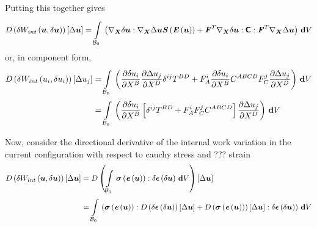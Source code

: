 Putting this together gives
\begin{equation}
  \directionalderiv{\delta\fnof{W_{int}}{\vectr{u},\delta\vectr{u}}}{\Delta\vectr{u}}=\gint{\embedmanifold{B}_{0}}{}{\pbrac{\doubledotprod{\gradient{\vectr{X}}{\delta\vectr{u}}}{\gradient{\vectr{X}}{\Delta\vectr{u}}\fnof{\tensor{S}}{\fnof{\tensor{E}}{\vectr{u}}}}+\doubledotprod{\transpose{\tensortwo{F}}\gradient{\vectr{X}}{\delta\vectr{u}}}{\doubledotprod{\tensorfour{C}}{\transpose{\tensortwo{F}}\gradient{\vectr{X}}{\Delta\vectr{u}}}}}}{V}
\end{equation}
or, in component form,
\begin{equation}
  \begin{split}
       D\left( \delta W_{int}\left( u_{i},\delta
        u_{i} \right)  \right) \left[ \Delta u_{j} \right]  &=  \displaystyle\int\limits_{ \mathcal{B} _{0}}^{} \,\left(  \dfrac{\partial \delta
          u_{i}}{\partial X^{B}}  \dfrac{\partial \Delta u_{j}}{\partial X^{D}}  \delta^{{i}{j}} T^{BD}+F^{i}_{A} \dfrac{\partial \delta
          u_{i}}{\partial X^{B}} C^{ABCD}F^{j}_{C} \dfrac{\partial \Delta u_{j}}{\partial X^{D}}  \right)\, \boldsymbol{\mathrm{d}}  V \\
    &=  \displaystyle\int\limits_{ \mathcal{B} _{0}}^{} \,\left(  \dfrac{\partial \delta
          u_{i}}{\partial X^{B}} \left[  \delta^{{i}{j}} T^{BD}+F^{i}_{A}F^{j}_{C}C^{ABCD} \right] \dfrac{\partial \Delta u_{j}}{\partial X^{D}}  \right)\, \boldsymbol{\mathrm{d}}  V 
  \end{split}
\end{equation}

Now, consider the directional derivative of the internal work variation in the current
configuration \ie with respect to cauchy stress and ??? strain
\begin{equation}
  \begin{split}
       D\left( \delta W_{int}\left( \boldsymbol{u},\delta\boldsymbol{u} \right)  \right) \left[ \Delta\boldsymbol{u} \right]  &=
       D\left(   \displaystyle\int\limits_{ \mathcal{B} _{0}}^{} \, \boldsymbol{\mathit{\sigma}}\left( 
             \boldsymbol{\mathit{e}}\left( \boldsymbol{u} \right)  \right) :\delta \boldsymbol{\mathit{\epsilon}}\left( \delta\boldsymbol{u} \right) \, \boldsymbol{\mathrm{d}}  V  \right) \left[ \Delta\boldsymbol{u} \right]  \\
    &=  \displaystyle\int\limits_{ \mathcal{B} _{0}}^{} \,\left(  \boldsymbol{\mathit{\sigma}}\left( 
           \boldsymbol{\mathit{e}}\left( \boldsymbol{u} \right)  \right) :   D\left( \delta \boldsymbol{\mathit{\epsilon}}\left( \delta\boldsymbol{u} \right)  \right) \left[ \Delta\boldsymbol{u} \right]  +
         D\left(  \boldsymbol{\mathit{\sigma}}\left( 
             \boldsymbol{\mathit{e}}\left( \boldsymbol{u} \right)  \right)  \right) \left[ \Delta\boldsymbol{u} \right]  :\delta \boldsymbol{\mathit{\epsilon}}\left( \delta\boldsymbol{u} \right)  \right)\, \boldsymbol{\mathrm{d}}  V 
  \end{split}
\end{equation}

